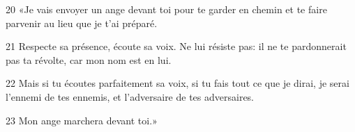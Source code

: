 20 «Je vais envoyer un ange devant toi pour te garder en chemin et te faire parvenir au lieu que je t’ai préparé.

21 Respecte sa présence, écoute sa voix. Ne lui résiste pas: il ne te pardonnerait pas ta révolte, car mon nom est en lui.

22 Mais si tu écoutes parfaitement sa voix, si tu fais tout ce que je dirai, je serai l’ennemi de tes ennemis, et l’adversaire de tes adversaires.

23 Mon ange marchera devant toi.»